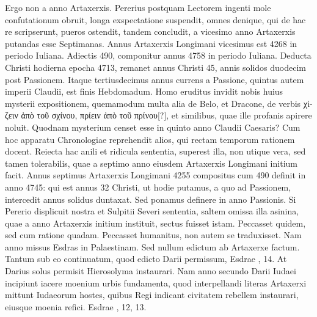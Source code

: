 Ergo non a  anno Artaxerxis.
Pererius postquam Lectorem ingenti mole confutationum
obruit, longa exspectatione suspendit, omnes denique, qui
de hac re scripserunt, pueros ostendit, tandem concludit, a vicesimo
anno Artaxerxis putandas esse Septimanas.
Annus Artaxerxis
Longimani vicesimus est 4268 in periodo Iuliana.
Adiectis 490,
componitur annus 4758 in periodo Iuliana.
Deducta Christi hodierna
epocha 4713, remanet annus Christi 45, annis solidos duodecim
post Passionem.
Itaque tertiusdecimus annus currens a Passione,
quintus autem imperii Claudii, est finis Hebdomadum.
Homo eruditus invidit nobis huius mysterii expositionem, quemamodum
multa alia de Belo, et Dracone, de verbis \textgreek{χίζειν ἀπὸ τοῦ σχίνου,
πρίειν ἀπὸ τοῦ πρίνου[?]}, et similibus, quae ille profanis apirere noluit.
Quodnam mysterium censet esse in quinto anno Claudii Caesaris?
Cum hoc apparatu Chronologiae reprehendit alios, qui rectam
temporum rationem docent.
Reiecta hac anili et ridicula sententia,
superest illa, non utique vera, sed tamen tolerabilis, quae a
septimo anno eiusdem Artaxerxis Longimani initium facit.
Annus septimus Artaxerxis Longimani 4255 compositus cum 490
definit in anno 4745: qui est annus 32 Christi, ut hodie putamus,
a quo ad Passionem, intercedit annus solidus duntaxat.
Sed
ponamus definere in anno Passionis.
Si Pererio displicuit nostra et
Sulpitii Severi sententia, saltem omissa illa asinina, quae a  anno
Artaxerxis initium instituit, sectus fuisset istam.
Peccasset quidem,
sed cum ratione quadam.
Peccasset humanitus, non autem
se traduxisset.
Nam  anno missus Esdras in Palaestinam.
Sed nullum edictum ab Artaxerxe factum. Tantum sub eo continuatum,
quod edicto Darii permissum, Esdrae , 14.
At Darius
solus permisit Hierosolyma instaurari.
Nam anno secundo Darii
Iudaei incipiunt iacere moenium urbis fundamenta, quod interpellandi
literas Artaxerxi mittunt Iudaeorum hostes, quibus Regi indicant
civitatem rebellem instaurari, eiusque moenia refici.
Esdrae , 12, 13.
